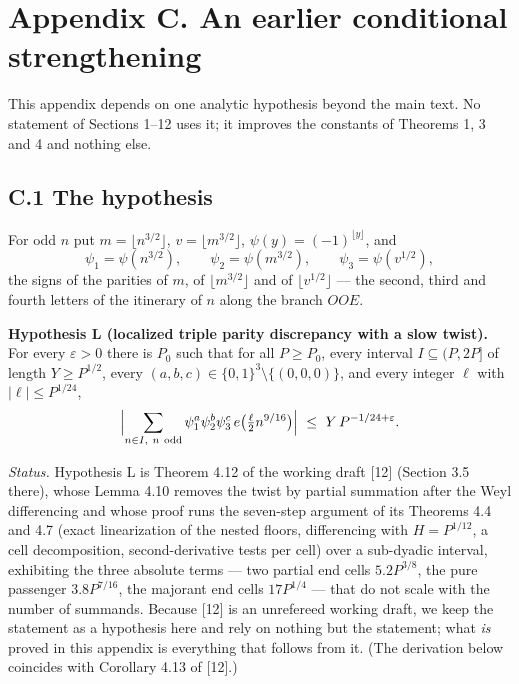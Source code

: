 \documentclass[11pt,a4paper]{article}
\begin{document}
\section{Appendix C. An earlier conditional
strengthening}\label{appendix-c.-an-earlier-conditional-strengthening}

This appendix depends on one analytic hypothesis beyond the main text.
No statement of Sections 1--12 uses it; it improves the constants of
Theorems 1, 3 and 4 and nothing else.

\subsection{C.1 The hypothesis}\label{c.1-the-hypothesis}

For odd \(n\) put \(m=\lfloor n^{3/2}\rfloor\),
\(v=\lfloor m^{3/2}\rfloor\), \(\psi(y)=(-1)^{\lfloor y\rfloor}\), and
\[
\psi_1=\psi(n^{3/2}),\qquad\psi_2=\psi(m^{3/2}),\qquad\psi_3=\psi(v^{1/2}),
\] the signs of the parities of \(m\), of \(\lfloor m^{3/2}\rfloor\) and
of \(\lfloor v^{1/2}\rfloor\) --- the second, third and fourth letters
of the itinerary of \(n\) along the branch \(OOE\).

\textbf{Hypothesis L (localized triple parity discrepancy with a slow
twist).} For every \(\varepsilon>0\) there is \(P_0\) such that for all
\(P\ge P_0\), every interval \(I\subseteq(P,2P]\) of length
\(Y\ge P^{1/2}\), every \((a,b,c)\in\{0,1\}^3\setminus\{(0,0,0)\}\), and
every integer \(\ell\) with \(|\ell|\le P^{1/24}\), \[
\Bigl|\sum_{n\in I,\ n\ \mathrm{odd}}\psi_1^{a}\psi_2^{b}\psi_3^{c}\,e\bigl(\tfrac{\ell}{2}n^{9/16}\bigr)\Bigr|
\ \le\ Y\,P^{-1/24+\varepsilon}.
\]

\emph{Status.} Hypothesis L is Theorem 4.12 of the working draft
{[}12{]} (Section 3.5 there), whose Lemma 4.10 removes the twist by
partial summation after the Weyl differencing and whose proof runs the
seven-step argument of its Theorems 4.4 and 4.7 (exact linearization of
the nested floors, differencing with \(H=P^{1/12}\), a cell
decomposition, second-derivative tests per cell) over a sub-dyadic
interval, exhibiting the three absolute terms --- two partial end cells
\(5.2P^{3/8}\), the pure passenger \(3.8P^{7/16}\), the majorant end
cells \(17P^{1/4}\) --- that do not scale with the number of summands.
Because {[}12{]} is an unrefereed working draft, we keep the statement
as a hypothesis here and rely on nothing but the statement; what
\emph{is} proved in this appendix is everything that follows from it.
(The derivation below coincides with Corollary 4.13 of {[}12{]}.)
\end{document}
